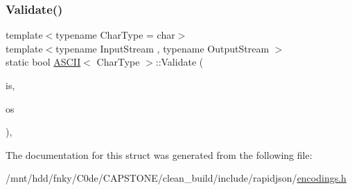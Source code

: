 \mbox{\label{structASCII_a398680588a09e6ce9b56e32195047c78}} 
\subsubsection{\texorpdfstring{Validate()}{Validate()}}
{\footnotesize\ttfamily template$<$typename Char\+Type  = char$>$ \\
template$<$typename Input\+Stream , typename Output\+Stream $>$ \\
static bool \hyperlink{structASCII}{A\+S\+C\+II}$<$ Char\+Type $>$\+::Validate (\begin{DoxyParamCaption}\item[{Input\+Stream \&}]{is,  }\item[{Output\+Stream \&}]{os }\end{DoxyParamCaption})\hspace{0.3cm}{\ttfamily [inline]}, {\ttfamily [static]}}



The documentation for this struct was generated from the following file\+:\begin{DoxyCompactItemize}
\item 
/mnt/hdd/fnky/\+C0de/\+C\+A\+P\+S\+T\+O\+N\+E/clean\+\_\+build/include/rapidjson/\hyperlink{encodings_8h}{encodings.\+h}\end{DoxyCompactItemize}
